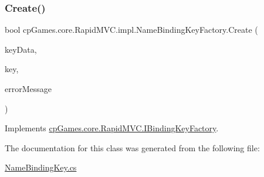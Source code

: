 \subsubsection{\texorpdfstring{Create()}{Create()}}
{\footnotesize\ttfamily bool cp\+Games.\+core.\+Rapid\+M\+V\+C.\+impl.\+Name\+Binding\+Key\+Factory.\+Create (\begin{DoxyParamCaption}\item[{object}]{key\+Data,  }\item[{out \mbox{\hyperlink{interfacecp_games_1_1core_1_1_rapid_m_v_c_1_1_i_binding_key}{I\+Binding\+Key}}}]{key,  }\item[{out string}]{error\+Message }\end{DoxyParamCaption})}



Implements \mbox{\hyperlink{interfacecp_games_1_1core_1_1_rapid_m_v_c_1_1_i_binding_key_factory_acebadb5b1ee05c449b3872428ce554ff}{cp\+Games.\+core.\+Rapid\+M\+V\+C.\+I\+Binding\+Key\+Factory}}.



The documentation for this class was generated from the following file\+:\begin{DoxyCompactItemize}
\item 
\mbox{\hyperlink{_name_binding_key_8cs}{Name\+Binding\+Key.\+cs}}\end{DoxyCompactItemize}
